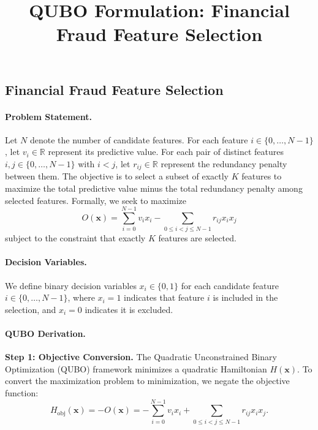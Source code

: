 \documentclass[12pt]{article}
\title{QUBO Formulation: Financial Fraud Feature Selection}
\date{}
\begin{document}
\maketitle

\subsection*{Financial Fraud Feature Selection}

\paragraph{Problem Statement.}
Let $N$ denote the number of candidate features. For each feature $i \in \{0, \dots, N-1\}$, let $v_i \in \mathbb{R}$ represent its predictive value. For each pair of distinct features $i, j \in \{0, \dots, N-1\}$ with $i < j$, let $r_{ij} \in \mathbb{R}$ represent the redundancy penalty between them. The objective is to select a subset of exactly $K$ features to maximize the total predictive value minus the total redundancy penalty among selected features. Formally, we seek to maximize
\begin{equation}
    O(\mathbf{x}) = \sum_{i=0}^{N-1} v_i x_i - \sum_{0 \le i < j \le N-1} r_{ij} x_i x_j
\end{equation}
subject to the constraint that exactly $K$ features are selected.

\paragraph{Decision Variables.}
We define binary decision variables $x_i \in \{0,1\}$ for each candidate feature $i \in \{0, \dots, N-1\}$, where $x_i = 1$ indicates that feature $i$ is included in the selection, and $x_i = 0$ indicates it is excluded.

\paragraph{QUBO Derivation.}
\textbf{Step 1: Objective Conversion.}
The Quadratic Unconstrained Binary Optimization (QUBO) framework minimizes a quadratic Hamiltonian $H(\mathbf{x})$. To convert the maximization problem to minimization, we negate the objective function:
\begin{equation}
    H_{\text{obj}}(\mathbf{x}) = -O(\mathbf{x}) = -\sum_{i=0}^{N-1} v_i x_i + \sum_{0 \le i < j \le N-1} r_{ij} x_i x_j.
\end{equation}
\end{document}
